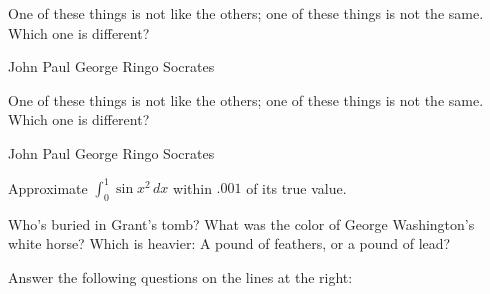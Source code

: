 \documentclass[a4paper,11pt]{exam}
\begin{document}
\begin{questions}
\question
One of these things is not like the others; one of these things is not
the same. Which one is different?
\begin{choices}
\choice John
\choice Paul
\choice George
\choice Ringo
\choice Socrates
\end{choices}

\question One of these things is not like the others; one of these
things is not the same. Which one is different?

\begin{oneparchoices}
\choice John
\choice Paul
\choice George
\choice Ringo
\CorrectChoice Socrates
\end{oneparchoices}


  \question
Approximate $\displaystyle \int_0^1 \sin x^2 \, dx$ within $.001$ of
its true value.


\question
{}

\question
Who’s buried in Grant’s tomb?
\answerline
\question
What was the color of George Washington’s white horse?
\answerline
\question
Which is heavier: A pound of feathers, or a pound of lead?
\answerline

\question
Answer the following questions on the lines at the right:
\end{questions}
\end{document}
